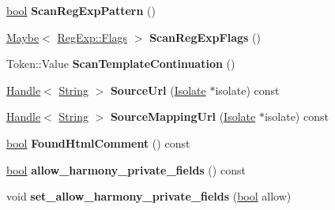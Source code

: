 \begin{DoxyCompactItemize}
\mbox{\hyperlink{classbool}{bool}} {\bfseries Scan\+Reg\+Exp\+Pattern} ()
\item 
\mbox{\label{classv8_1_1internal_1_1Scanner_a1499aff4667a9ba8ba54b8bdcb805efd}} 
\mbox{\hyperlink{classv8_1_1Maybe}{Maybe}}$<$ \mbox{\hyperlink{classv8_1_1RegExp_aa4718a5c1f18472aff3bf51ed694fc5a}{Reg\+Exp\+::\+Flags}} $>$ {\bfseries Scan\+Reg\+Exp\+Flags} ()
\item 
\mbox{\label{classv8_1_1internal_1_1Scanner_a55e23955e70102d7623126d6c7dbb555}} 
Token\+::\+Value {\bfseries Scan\+Template\+Continuation} ()
\item 
\mbox{\label{classv8_1_1internal_1_1Scanner_abe075ed90f78cfc60c9a1a0132c9b194}} 
\mbox{\hyperlink{classv8_1_1internal_1_1Handle}{Handle}}$<$ \mbox{\hyperlink{classv8_1_1internal_1_1String}{String}} $>$ {\bfseries Source\+Url} (\mbox{\hyperlink{classv8_1_1internal_1_1Isolate}{Isolate}} $\ast$isolate) const
\item 
\mbox{\label{classv8_1_1internal_1_1Scanner_a59276016e564e23110a6acc9a0cf2525}} 
\mbox{\hyperlink{classv8_1_1internal_1_1Handle}{Handle}}$<$ \mbox{\hyperlink{classv8_1_1internal_1_1String}{String}} $>$ {\bfseries Source\+Mapping\+Url} (\mbox{\hyperlink{classv8_1_1internal_1_1Isolate}{Isolate}} $\ast$isolate) const
\item 
\mbox{\label{classv8_1_1internal_1_1Scanner_a30b41d55ff19a4063d91caf18ad19865}} 
\mbox{\hyperlink{classbool}{bool}} {\bfseries Found\+Html\+Comment} () const
\item 
\mbox{\label{classv8_1_1internal_1_1Scanner_a38fb64f05975529993b504b57f40d34f}} 
\mbox{\hyperlink{classbool}{bool}} {\bfseries allow\+\_\+harmony\+\_\+private\+\_\+fields} () const
\item 
\mbox{\label{classv8_1_1internal_1_1Scanner_aacb0591c543aed10d503a000a95064c7}} 
void {\bfseries set\+\_\+allow\+\_\+harmony\+\_\+private\+\_\+fields} (\mbox{\hyperlink{classbool}{bool}} allow)
\item 
\mbox{\label{classv8_1_1internal_1_1Scanner_af7dd7cf50fd74fb39df46f007ccec4d2}} 

\end{DoxyCompactItemize}

